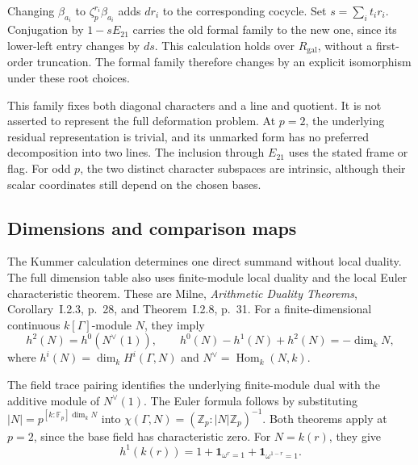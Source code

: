 Changing \(\beta_{a_i}\) to \(\zeta_p^{r_i}\beta_{a_i}\) adds
\(dr_i\) to the corresponding cocycle. Set \(s=\sum_i t_i r_i\).
Conjugation by \(1-sE_{21}\) carries the old formal family to the new
one, since its lower-left entry changes by \(ds\).
This calculation holds over \(R_{\mathrm{gal}}\), without a first-order truncation.
The formal family therefore changes by an explicit isomorphism under
these root choices.

This family fixes both diagonal characters and a line and quotient.
It is not asserted to represent the full deformation problem.
At \(p=2\), the underlying residual representation is trivial, and its
unmarked form has no preferred decomposition into two lines.
The inclusion through \(E_{21}\) uses the stated frame or flag.
For odd \(p\), the two distinct character subspaces are intrinsic,
although their scalar coordinates still depend on the chosen bases.

\subsection{Dimensions and comparison maps}

The Kummer calculation determines one direct summand without local
duality. The full dimension table also uses finite-module local duality
and the local Euler characteristic theorem.
These are Milne, \emph{Arithmetic Duality Theorems},
Corollary~I.2.3, p.~28, and Theorem~I.2.8, p.~31.
For a finite-dimensional continuous \(k[\Gamma]\)-module \(N\), they imply
\[
 h^2(N)=h^0(N^\vee(1)),\qquad
 h^0(N)-h^1(N)+h^2(N)=-\dim_kN,
\]
where \(h^i(N)=\dim_kH^i(\Gamma,N)\) and
\(N^\vee=\operatorname{Hom}_k(N,k)\).

The field trace pairing identifies the underlying finite-module dual
with the additive module of \(N^\vee(1)\).
The Euler formula follows by substituting
\(|N|=p^{[k:\mathbb F_p]\dim_kN}\) into
\(\chi(\Gamma,N)=(\mathbb Z_p:|N|\mathbb Z_p)^{-1}\).
Both theorems apply at \(p=2\), since the base field has characteristic zero.
For \(N=k(r)\), they give
\[
 h^1(k(r))=1+\mathbf1_{\omega^r=1}+\mathbf1_{\omega^{1-r}=1}.
\]

